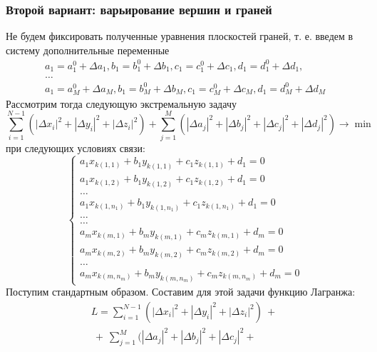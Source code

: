 \documentclass[a4paper,12pt, titlepage]{article}
\begin{document}
\subsubsection{Второй вариант: варьирование вершин и граней}
	\begin{flushleft}
		Не будем фиксировать полученные уравнения плоскостей граней, т. е. введем в систему 
		дополнительные переменные
		$$
			\begin{aligned}
				a_{1} = a^{0}_{1} + \Delta a_{1}, 
				b_{1} = b^{0}_{1} + \Delta b_{1}, 
				c_{1} = c^{0}_{1} + \Delta c_{1}, 
				d_{1} = d^{0}_{1} + \Delta d_{1}, \\
				\ldots \\
				a_{1} = a^{0}_{M} + \Delta a_{M}, 
				b_{1} = b^{0}_{M} + \Delta b_{M}, 
				c_{1} = c^{0}_{M} + \Delta c_{M}, 
				d_{1} = d^{0}_{M} + \Delta d_{M}	
			\end{aligned}
		$$
		Рассмотрим тогда следующую экстремальную задачу
		$$	
			\sum\limits_{i = 1}^{N - 1}(|\Delta x_{i}|^{2} + |\Delta y_{i}|^{2} + |\Delta z_{i}|^{2}) + 
			\sum\limits_{j = 1}^{M}(|\Delta a_{j}|^{2} + |\Delta b_{j}|^{2} + |\Delta c_{j}|^{2} + 
			|\Delta d_{j}|^{2}) \to \min		
		$$
		при следующих условиях связи:
		$$
			\left\{
				\begin{aligned}
					a_{1} x_{k(1, 1)} + b_{1} y_{k(1, 1)} + c_{1} z_{k(1, 1)} + d_{1} = 0 \\
					a_{1} x_{k(1, 2)} + b_{1} y_{k(1, 2)} + c_{1} z_{k(1, 2)} + d_{1} = 0 \\
					\ldots \\
					a_{1} x_{k(1, n_{1})} + b_{1} y_{k(1, n_{1})} + c_{1} z_{k(1, n_{1})} + d_{1} = 0 \\
					\ldots \\
					\ldots \\
					a_{m} x_{k(m, 1)} + b_{m} y_{k(m, 1)} + c_{m} z_{k(m, 1)} + d_{m} = 0 \\
					a_{m} x_{k(m, 2)} + b_{m} y_{k(m, 2)} + c_{m} z_{k(m, 2)} + d_{m} = 0 \\
					\ldots \\
					a_{m} x_{k(m, n_{m})} + b_{m} y_{k(m, n_{m})} + c_{m} z_{k(m, n_{m})} + d_{m} = 0
				\end{aligned}
			\right.
		$$
		Поступим стандартным образом. Составим для этой задачи функцию Лагранжа:
		$$
			\begin{aligned}
				L = \sum\limits_{i = 1}^{N - 1}(|\Delta x_{i}|^{2} + |\Delta y_{i}|^{2} + |\Delta z_{i}|^{2})~ + ~\\
				~ + ~\sum\limits_{j = 1}^{M}(|\Delta a_{j}|^{2} + |\Delta b_{j}|^{2} + |\Delta c_{j}|^{2} + 

\end{aligned}$$
\end{flushleft}
\end{document}
